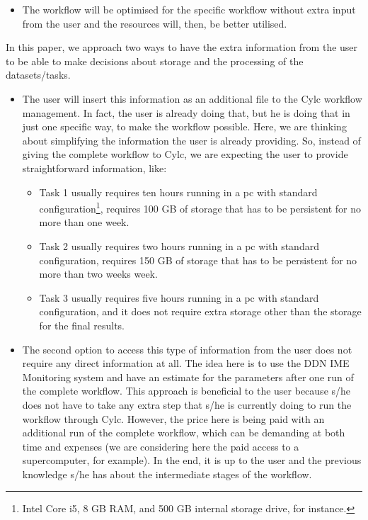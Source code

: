 \documentclass[a4paper]{article}
\begin{document}
{{{{\begin{itemize}
\item The workflow will be optimised for the specific workflow without extra input from the user and the resources will, then, be better utilised.

\end{itemize}

In this paper, we approach two ways to have the extra information from the user to be able to make decisions about storage and the processing of the datasets/tasks.

\begin{itemize}

\item The user will insert this information as an additional file to the Cylc workflow management. In fact, the user is already doing that, but he is doing that in just one specific way, to make the workflow possible. Here, we are thinking about simplifying the information the user is already providing. So, instead of giving the complete workflow to Cylc, we are expecting the user to provide straightforward information, like:

\begin{itemize}

\item Task 1 usually requires ten hours running in a pc with standard configuration\footnote{Intel Core i5, 8 GB RAM, and 500 GB internal storage drive, for instance.}, requires 100 GB of storage that has to be persistent for no more than one week.

\item Task 2 usually requires two hours running in a pc with standard configuration, requires 150 GB of storage that has to be persistent for no more than two weeks week.

\item Task 3 usually requires five hours running in a pc with standard configuration, and it does not require extra storage other than the storage for the final results.

\end{itemize}

\item The second option to access this type of information from the user does not require any direct information at all. The idea here is to use the DDN IME Monitoring system and have an estimate for the parameters after one run of the complete workflow. This approach is beneficial to the user because s/he does not have to take any extra step that s/he is currently doing to run the workflow through Cylc. However, the price here is being paid with an additional run of the complete workflow, which can be demanding at both time and expenses (we are considering here the paid access to a supercomputer, for example). In the end, it is up to the user and the previous knowledge s/he has about the intermediate stages of the workflow.


\end{itemize}}}}}
\end{document}
